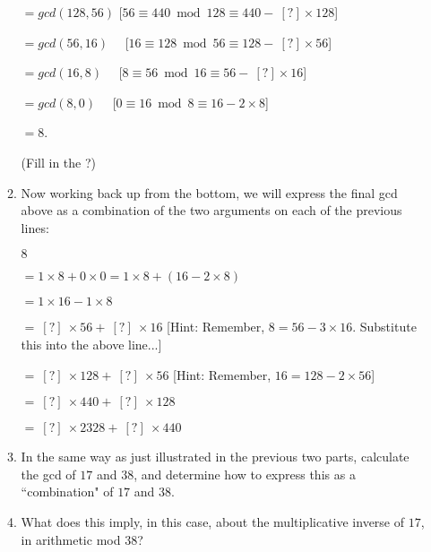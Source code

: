 \documentclass[11pt]{article}
\newif\ifsolutions
\begin{document}
\begin{enumerate}
\begin{enumerate}
$= gcd(128, 56)$   [$56 \equiv 440 \bmod {128} \equiv 440 - \ [?] \times 128$]  \ifsolutions  {\bf solution}:  $[?] = 3$ \fi

$= gcd(56, 16)$ \ \  [$16 \equiv 128 \bmod{56} \equiv 128 - \ [?] \times 56$]   \ifsolutions  {\bf solution}:  $[?] = 2$ \fi

$= gcd(16, 8)$  \ \ [$8 \equiv 56 \bmod{16} \equiv 56 - \ [?] \times 16$] \ifsolutions {\bf solution}: $[?] = 3$ \fi

$= gcd(8, 0)$  \ \ [$0 \equiv 16 \bmod{8} \equiv 16 - 2 \times 8$]

$= 8$.

(Fill in the ?)


\item Now working back up from the bottom, we will express the final gcd above as a combination of the two arguments on each of the previous lines:

$8$

$= 1 \times 8 + 0 \times 0 = 1 \times 8 + (16 - 2 \times 8)$

$= 1 \times 16 - 1 \times 8$ 

$= \ [?] \ \times 56 + \ [?] \ \times 16$ [Hint: Remember, $8 = 56 - 3 \times 16$. Substitute this into the above line...] \ifsolutions{$1 \times 16 - 1 \times (56 - 3 \times 16) = -1 \times 56 + 4 \times 16$} \fi

$= \ [?] \ \times 128 + \ [?] \ \times 56$ [Hint: Remember, $16 = 128 - 2 \times 56$] \ifsolutions{$4 \times 128 - 9 \times 56$} \fi

$= \ [?] \ \times 440 + \ [?] \ \times 128$ \ifsolutions{$-9 \times 440 + 31 \times 128$} \fi

$= \ [?] \  \times 2328 + \ [?] \ \times 440$ \ifsolutions{$31 \times 2328 - 164 \times 440$} \fi

\item In the same way as just illustrated in the previous two parts, calculate the gcd of $17$ and $38$, and determine how to express this as a ``combination" of $17$ and $38$. \ifsolutions{$\gcd(17, 38) = 1 = 13 \times 38 - 29 \times 17; also, more simply, -4 \times 38 + 9 \times 17, but the algorithm produces the former$} \fi

\item What does this imply, in this case, about the multiplicative inverse of $17$, in arithmetic mod $38$? \ifsolutions{It is equal to -29, which is equal to 9}

{\bf Motivation for problem:} This is supposed to provide the students with some understanding of how the extended-gcd works. \fi
\end{enumerate}



\end{enumerate}
\end{document}
